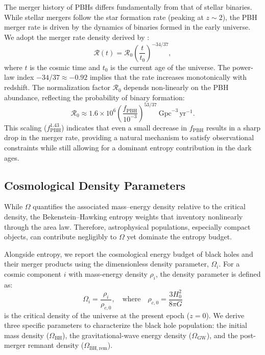 \documentclass[twocolumn]{aastex631}
\begin{document}
The merger history of PBHs differs fundamentally from that of stellar binaries. While stellar mergers follow the star formation rate (peaking at $z \sim 2$), the PBH merger rate is driven by the dynamics of binaries formed in the early universe. We adopt the merger rate density derived by \citet{Sasaki_2016}:
\begin{equation}
    \mathcal{R}(t) = \mathcal{R}_0 \left( \frac{t}{t_0} \right)^{-34/37},
\end{equation}
where $t$ is the cosmic time and $t_0$ is the current age of the universe. The power-law index $-34/37 \approx -0.92$ implies that the rate increases monotonically with redshift. The normalization factor $\mathcal{R}_0$ depends non-linearly on the PBH abundance, reflecting the probability of binary formation:
\begin{equation}
    \mathcal{R}_0 \approx 1.6 \times 10^6 \left( \frac{f_\mathrm{PBH}}{10^{-3}} \right)^{53/37} ~\mathrm{Gpc}^{-3}\,\mathrm{yr}^{-1}.
\end{equation}
This scaling ($f_\mathrm{PBH}^{1.43}$) indicates that even a small decrease in $f_\mathrm{PBH}$ results in a sharp drop in the merger rate, providing a natural mechanism to satisfy observational constraints while still allowing for a dominant entropy contribution in the dark ages.

\subsection{Cosmological Density Parameters}
While $\Omega$ quantifies the associated mass–energy density relative to the critical density, the Bekenstein–Hawking entropy weights that inventory nonlinearly through the area law. Therefore, astrophysical populations, especially compact objects, can contribute negligibly to $\Omega$ yet dominate the entropy budget.

Alongside entropy, we report the cosmological energy budget of black holes and their merger products using the dimensionless density parameter, $\Omega_i$. For a cosmic component $i$ with mass-energy density $\rho_i$, the density parameter is defined as:
\begin{equation} 
\Omega_i = \frac{\rho_i}{\rho_{c,0}}, \quad \text{where} \quad \rho_{c,0} = \frac{3H_0^2}{8\pi G} 
\end{equation}
is the critical density of the universe at the present epoch ($z=0$). We derive three specific parameters to characterize the black hole population: the initial mass density ($\Omega_\mathrm{BH}$), the gravitational-wave energy density ($\Omega_\mathrm{GW}$), and the post-merger remnant density ($\Omega_\mathrm{BH,rem}$).
\end{document}
